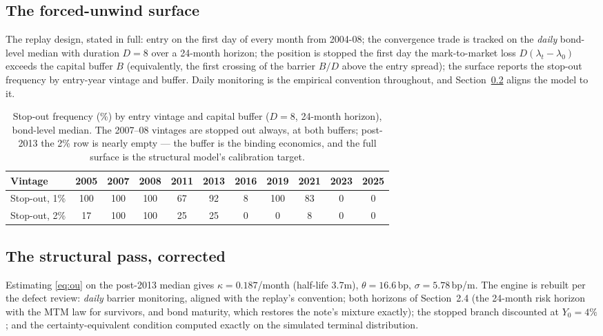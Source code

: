 \documentclass[11pt]{article}
\begin{document}
\subsection{The forced-unwind surface}

The replay design, stated in full: entry on the first day of every month from 2004-08; the convergence trade is tracked on the \emph{daily} bond-level median with duration $D=8$ over a 24-month horizon; the position is stopped the first day the mark-to-market loss $D(\lambda_t-\lambda_0)$ exceeds the capital buffer $B$ (equivalently, the first crossing of the barrier $B/D$ above the entry spread); the surface reports the stop-out frequency by entry-year vintage and buffer. Daily monitoring is the empirical convention throughout, and Section~\ref{sec:struct} aligns the model to it.

\begin{table}[h!]
\centering\small
\begin{tabular}{lcccccccccc}
\toprule
Vintage & 2005 & 2007 & 2008 & 2011 & 2013 & 2016 & 2019 & 2021 & 2023 & 2025 \\
\midrule
Stop-out, 1\% & 100 & 100 & 100 & 67 & 92 & 8 & 100 & 83 & 0 & 0 \\
Stop-out, 2\% & 17 & 100 & 100 & 25 & 25 & 0 & 0 & 8 & 0 & 0 \\
\bottomrule
\end{tabular}
\caption{Stop-out frequency (\%) by entry vintage and capital buffer ($D=8$, 24-month horizon), bond-level median. The 2007--08 vintages are stopped out always, at both buffers; post-2013 the 2\% row is nearly empty --- the buffer is the binding economics, and the full surface is the structural model's calibration target.}
\end{table}

\subsection{The structural pass, corrected}\label{sec:struct}

Estimating \eqref{eq:ou} on the post-2013 median gives $\kappa=0.187$/month (half-life 3.7m), $\theta=16.6$\,bp, $\sigma=5.78$\,bp/m. The engine is rebuilt per the defect review: \emph{daily} barrier monitoring, aligned with the replay's convention; both horizons of Section~2.4 (the 24-month risk horizon with the MTM law for survivors, and bond maturity, which restores the note's mixture exactly); the stopped branch discounted at $Y_0=4\%$; and the certainty-equivalent condition computed exactly on the simulated terminal distribution.
\end{document}
